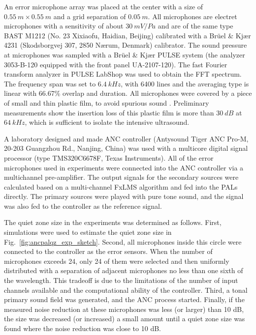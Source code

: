 An error microphone array was placed at the center with a size of $\SI{0.55}{m}\times \SI{0.55}{m}$ and a grid separation of $\SI{0.05}{m}$. 
All microphones are electret microphones with a sensitivity of about $\SI{30}{mV/Pa}$ and are of the same type BAST M1212 (No. 23 Xixiaofu, Haidian, Beijing) calibrated with a Brüel \& Kjær 4231 (Skodsborgvej 307, 2850 Nærum, Denmark) calibrator. 
The sound pressure at microphones was sampled with a Brüel \& Kjær PULSE system (the analyzer 3053-B-120 equipped with the front panel UA-2107-120). 
The fast Fourier transform analyzer in PULSE LabShop was used to obtain the FFT spectrum. 
The frequency span was set to $\SI{6.4}{kHz}$, with 6400 lines and the averaging type is linear with 66.67\% overlap and  duration. 
All microphones were covered by a piece of small and thin plastic film, to avoid spurious sound \cite{Ji2019ExperimentalInvestigationParameters}. 
Preliminary measurements show the insertion loss of this plastic film is more than $\SI{30}{dB}$ at $\SI{64}{kHz}$, which is sufficient to isolate the intensive ultrasound.

A laboratory designed and made ANC controller (Antysound Tiger ANC Pro-M, 20-203 Guangzhou Rd., Nanjing, China) was used with a multicore digital signal processor (type TMS320C6678F, Texas Instruments). 
All of the error microphones used in experiments were connected into the ANC controller via a multichannel pre-amplifier. 
The output signals for the secondary sources were calculated based on a multi-channel FxLMS algorithm and fed into the PALs directly. 
The primary sources were played with pure tone sound, and the signal was also fed to the controller as the reference signal. 

The quiet zone size in the experiments was determined as follows. 
First, simulations were used to estimate the quiet zone size in Fig.~\ref{fig:ancpalqz_exp_sketch}. 
Second, all microphones inside this circle were connected to the controller as the error sensors. 
When the number of microphones exceeds 24, only 24 of them were selected and then uniformly distributed with a separation of adjacent microphones no less than one sixth of the wavelength. 
This tradeoff is due to the limitations of the number of input channels available and the computational ability of the controller. 
Third, a tonal primary sound field was generated, and the ANC process started. 
Finally, if the measured noise reduction at these microphones was less (or larger) than 10 dB, the size was decreased (or increased) a small amount until a quiet zone size was found where the noise reduction was close to 10 dB.  

